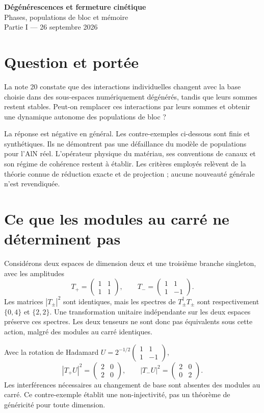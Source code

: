 \documentclass[11pt,a4paper]{article}
\begin{document}
\begin{center}
{\Large\bfseries Dégénérescences et fermeture cinétique}\\[4pt]
{\normalsize Phases, populations de bloc et mémoire}\\[2pt]
{\small Partie I --- 26 septembre 2026}
\end{center}

\section{Question et portée}
La note 20 constate que des interactions individuelles changent avec la
base choisie dans des sous-espaces numériquement dégénérés, tandis que
leurs sommes restent stables. Peut-on remplacer ces interactions par
leurs sommes et obtenir une dynamique autonome des populations de bloc ?

La réponse est négative en général. Les contre-exemples ci-dessous sont
finis et synthétiques. Ils ne démontrent pas une défaillance du modèle
de populations pour l'AlN réel. L'opérateur physique du matériau, ses
conventions de canaux et son régime de cohérence restent à établir.
Les critères employés relèvent de la théorie connue de réduction exacte
et de projection ; aucune nouveauté générale n'est revendiquée.

\section{Ce que les modules au carré ne déterminent pas}
Considérons deux espaces de dimension deux et une troisième branche
singleton, avec les amplitudes
\[
 T_+=\begin{pmatrix}1&1\\1&1\end{pmatrix},\qquad
 T_-=\begin{pmatrix}1&1\\1&-1\end{pmatrix}.
\]
Les matrices $|T_\pm|^2$ sont identiques, mais les spectres de
$T_\pm^\dagger T_\pm$ sont respectivement $\{0,4\}$ et $\{2,2\}$.
Une transformation unitaire indépendante sur les deux espaces préserve
ces spectres. Les deux tenseurs ne sont donc pas équivalents sous cette
action, malgré des modules au carré identiques.

Avec la rotation de Hadamard
$U=2^{-1/2}\left(\begin{smallmatrix}1&1\\1&-1\end{smallmatrix}\right)$,
\[
 |T_+U|^2=\begin{pmatrix}2&0\\2&0\end{pmatrix},\qquad
 |T_-U|^2=\begin{pmatrix}2&0\\0&2\end{pmatrix}.
\]
Les interférences nécessaires au changement de base sont absentes des
modules au carré. Ce contre-exemple établit une non-injectivité, pas
un théorème de généricité pour toute dimension.
\end{document}
